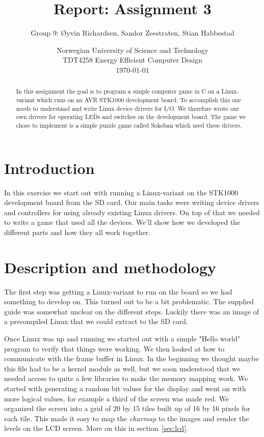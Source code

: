 \documentclass[a4paper,11pt]{article}
\title{\textbf{Report: Assignment 3}}
\author{Group 9: \O yvin Richardsen, Sandor Zeestraten, Stian Habbestad}
\date{{Norwegian University of Science and Technology \\
TDT4258 Energy Efficient Computer Design \\}
\today}
\begin{document}
\maketitle
\bigskip\bigskip\bigskip\bigskip\bigskip\bigskip\bigskip\bigskip\bigskip

\begin{abstract}
In this assignment the goal is to program a simple computer game in C on a Linux-variant which runs on an AVR STK1000 development board. To accomplish this one needs to understand and write Linux device drivers for I/O. We therefore wrote our own drivers for operating LEDs and switches on the development board. The game we chose to implement is a simple puzzle game called Sokoban which used these drivers.
\end{abstract}

\newpage
\tableofcontents
\newpage

\section{Introduction}
In this exercise we start out with running a Linux-variant on the STK1000 development board from the SD card. Our main tasks were writing device drivers and controllers for using already existing Linux drivers. On top of that we needed to write a game that used all the devices. We'll show how we developed the different parts and how they all work together.

\section{Description and methodology}
The first step was getting a Linux-variant to run on the board so we had something to develop on. This turned out to be a bit problematic. The supplied guide was somewhat unclear on the different steps. Luckily there was an image of a precompiled Linux that we could extract to the SD card. 

Once Linux was up and running we started out with a simple "Hello world" program to verify that things were working. We then looked at how to communicate with the frame buffer in Linux. In the beginning we thought maybe this file had to be a kernel module as well, but we soon understood that we needed access to quite a few libraries to make the memory mapping work. We started with generating a random bit values for the display and went on with more logical values, for example a third of the screen was made red. We organized the screen into a grid of 20 by 15 tiles built up of 16 by 16 pixels for each tile. This made it easy to map the \textit{charmap} to the images and render the levels on the LCD screen. More on this in section~\ref{sec:lcd}.
\end{document}
